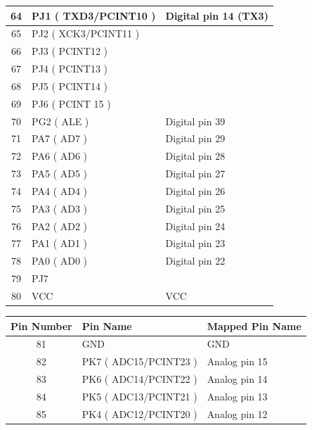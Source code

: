 \begin{appendix}
\begin{table}[h]
\begin{tabular}{|c|p{15.855em}|p{11.43em}|}
    \hline
    64    & PJ1 ( TXD3/PCINT10 ) & Digital pin 14 (TX3) \\
    \hline
    65    & PJ2 ( XCK3/PCINT11 ) & \multicolumn{1}{l|}{} \\
    \hline
    66    & PJ3 ( PCINT12 ) & \multicolumn{1}{l|}{} \\
    \hline
    67    & PJ4 ( PCINT13 ) & \multicolumn{1}{l|}{} \\
    \hline
    68    & PJ5 ( PCINT14 ) & \multicolumn{1}{l|}{} \\
    \hline    
    69    & PJ6 ( PCINT 15 ) & \multicolumn{1}{l|}{} \\
    \hline
    70    & PG2 ( ALE ) & Digital pin 39 \\
    \hline
    71    & PA7 ( AD7 ) & Digital pin 29 \\
    \hline
    72    & PA6 ( AD6 ) & Digital pin 28 \\
    \hline
    73    & PA5 ( AD5 ) & Digital pin 27 \\
    \hline
    74    & PA4 ( AD4 ) & Digital pin 26 \\
    \hline
    75    & PA3 ( AD3 ) & Digital pin 25 \\
    \hline
    76    & PA2 ( AD2 ) & Digital pin 24 \\
    \hline
    77    & PA1 ( AD1 ) & Digital pin 23 \\
    \hline
    78    & PA0 ( AD0 ) & Digital pin 22 \\
    \hline
    79    & PJ7   & \multicolumn{1}{l|}{} \\
    \hline
    80    & VCC   & VCC \\
    \hline
    \end{tabular}%
\end{table}%
\begin{table}[h]
  \centering
    \begin{tabular}{|c|p{15.855em}|p{11.43em}|}
    \hline
    \multicolumn{1}{|p{7.07em}|}{\textbf{Pin Number}} & \textbf{Pin Name} & \textbf{Mapped Pin Name} \\
    \hline
    81    & GND   & GND \\
    \hline
    82    & PK7 ( ADC15/PCINT23 ) & Analog pin 15 \\
    \hline
    83    & PK6 ( ADC14/PCINT22 ) & Analog pin 14 \\
    \hline
    84    & PK5 ( ADC13/PCINT21 ) & Analog pin 13 \\
    \hline
    85    & PK4 ( ADC12/PCINT20 ) & Analog pin 12 \\

\end{tabular}
\end{table}
\end{appendix}
